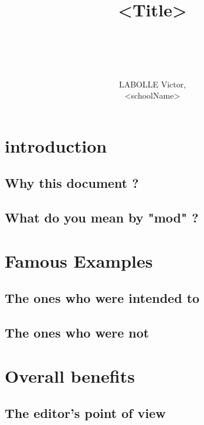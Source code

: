 \documentclass[a4paper,11pt]{article}
\begin{document}
\thispagestyle{empty}
\sffamily

\enlargethispage{8cm}
\author{LABOLLE Victor,\\<schoolName>}
\title{{\large <Title>}\\\vspace*{4cm}{\Huge Aspectize}\\\bigskip{}\\\bigskip{\large  }}
\maketitle
\vspace*{9cm}

\newpage
{}
\newpage


\section{introduction}

\subsection{Why this document ?}

\subsection{What do you mean by "mod" ?}


\section{Famous Examples}

\subsection{The ones who were intended to}

\subsection{The ones who were not}


\section{Overall benefits}

\subsection{The editor's point of view}
\end{document}
